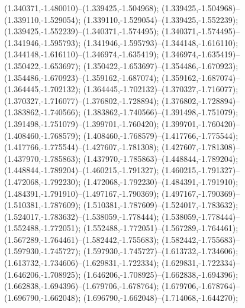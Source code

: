 (1.340371,-1.480010)--(1.339425,-1.504968);
 (1.339425,-1.504968)--(1.339110,-1.529054);
 (1.339110,-1.529054)--(1.339425,-1.552239);
 (1.339425,-1.552239)--(1.340371,-1.574495);
 (1.340371,-1.574495)--(1.341946,-1.595793);
 (1.341946,-1.595793)--(1.344148,-1.616110);
 (1.344148,-1.616110)--(1.346974,-1.635419);
 (1.346974,-1.635419)--(1.350422,-1.653697);
 (1.350422,-1.653697)--(1.354486,-1.670923);
 (1.354486,-1.670923)--(1.359162,-1.687074);
 (1.359162,-1.687074)--(1.364445,-1.702132);
 (1.364445,-1.702132)--(1.370327,-1.716077);
 (1.370327,-1.716077)--(1.376802,-1.728894);
 (1.376802,-1.728894)--(1.383862,-1.740566);
 (1.383862,-1.740566)--(1.391498,-1.751079);
 (1.391498,-1.751079)--(1.399701,-1.760420);
 (1.399701,-1.760420)--(1.408460,-1.768579);
 (1.408460,-1.768579)--(1.417766,-1.775544);
 (1.417766,-1.775544)--(1.427607,-1.781308);
 (1.427607,-1.781308)--(1.437970,-1.785863);
 (1.437970,-1.785863)--(1.448844,-1.789204);
 (1.448844,-1.789204)--(1.460215,-1.791327);
 (1.460215,-1.791327)--(1.472068,-1.792230);
 (1.472068,-1.792230)--(1.484391,-1.791910);
 (1.484391,-1.791910)--(1.497167,-1.790369);
 (1.497167,-1.790369)--(1.510381,-1.787609);
 (1.510381,-1.787609)--(1.524017,-1.783632);
 (1.524017,-1.783632)--(1.538059,-1.778444);
 (1.538059,-1.778444)--(1.552488,-1.772051);
 (1.552488,-1.772051)--(1.567289,-1.764461);
 (1.567289,-1.764461)--(1.582442,-1.755683);
 (1.582442,-1.755683)--(1.597930,-1.745727);
 (1.597930,-1.745727)--(1.613732,-1.734606);
 (1.613732,-1.734606)--(1.629831,-1.722334);
 (1.629831,-1.722334)--(1.646206,-1.708925);
 (1.646206,-1.708925)--(1.662838,-1.694396);
 (1.662838,-1.694396)--(1.679706,-1.678764);
 (1.679706,-1.678764)--(1.696790,-1.662048);
 (1.696790,-1.662048)--(1.714068,-1.644270);
